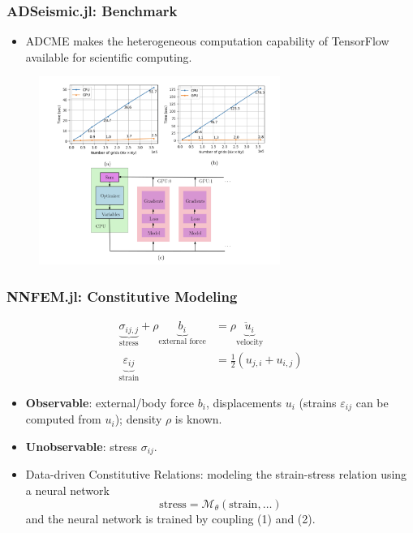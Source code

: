 \documentclass{beamer}
\begin{document}
\begin{frame}
	\frametitle{ADSeismic.jl: Benchmark}
	\begin{itemize}
		\item ADCME makes the heterogeneous computation capability of TensorFlow available for scientific computing. 
	\end{itemize}
	\begin{figure}[hbt]
  \includegraphics[width=0.7\textwidth]{../benchmark}
\end{figure}
\end{frame}

\begin{frame}
	\frametitle{NNFEM.jl: Constitutive Modeling}
	
	\begin{equation}\label{equ:momentum}
  \begin{aligned}
		\underbrace{\sigma_{ij,j}}_{\mbox{stress}} + \rho \underbrace{b_i}_{\mbox{external force}} &= \rho \underbrace{\ddot u_i}_{\mbox{velocity}}\\
		\underbrace{\varepsilon_{ij}}_{\mbox{strain}} &= \frac{1}{2}(u_{j,i}+u_{i,j})
	\end{aligned}
\end{equation}

	
	\begin{itemize}
		\item \textbf{Observable}: external/body force $b_i$, displacements $u_i$ (strains $\varepsilon_{ij}$ can be computed from $u_i$); density $\rho$ is known.  
		\item \textbf{Unobservable}: stress $\sigma_{ij}$. 
		\item Data-driven Constitutive Relations: modeling the strain-stress relation using a neural network
\begin{equation}\label{equ:nn}
  	\boxed{\mbox{stress} =\mathcal{M}_{\theta}(\mbox{strain},\ldots)}
\end{equation}
		and the neural network is trained by coupling (1) and (2).
	\end{itemize}


\end{frame}
\end{document}
